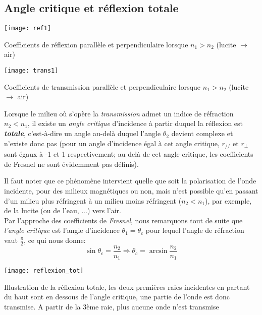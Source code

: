 
\subsection{Angle critique et réflexion totale}
\begin{marginfigure}%
	\texttt{[image: ref1]}
	\caption{Coefficients de réflexion parallèle et perpendiculaire lorsque $n_1>n_2$ (lucite $\rightarrow$ air)}
	\label{fig_ref3}
\end{marginfigure} 
\begin{marginfigure}%
	\texttt{[image: trans1]}
	\caption{Coefficients de transmission parallèle et perpendiculaire lorsque $n_1>n_2$ (lucite $\rightarrow$ air)}
\end{marginfigure} 
Lorsque le milieu où s'opère la \textit{transmission} admet un indice de réfraction $n_{2}<n_{1}$, il existe un \textit{angle critique} d'incidence à partir duquel la réflexion est \textit{\textbf{totale}}, c'est-à-dire un angle au-delà duquel l'angle $\theta_2$ devient complexe et n'existe donc pas (pour un angle d'incidence égal à cet angle critique, $r_{//}$ et $r_{\perp}$ sont égaux à  -1 et 1 respectivement; au delà de cet angle critique, les coefficients de Fresnel ne sont évidemment pas définis). 

Il faut noter que ce phénomène intervient quelle que soit la polarisation de l'onde incidente, pour des milieux magnétiques ou non, mais n'est possible qu'en passant d'un milieu plus réfringent à un milieu moins réfringent ($n_{2} < n_1$), par exemple, de la lucite (ou de l'eau, ...) vers l'air.\\ 

Par l'approche des coefficients de \textit{Fresnel}, nous remarquons tout de suite que \textit{l'angle critique} est l'angle d'incidence $\theta_{1} = \theta_{c}$ pour lequel l'angle de réfraction vaut $\frac{\pi}{2}$, ce qui nous donne: 
\[\sin \theta_{c} = \frac{n_{2}}{n_{1}} \Rightarrow \theta_{c} = \arcsin \frac{n_{2}}{n_{1}}\]
\begin{marginfigure}%
	\texttt{[image: reflexion\_tot]}
	\caption{Illustration de la réflexion totale, les deux premières raies incidentes en partant du haut sont en dessous de l'angle critique, une partie de l'onde est donc transmise. A partir de la 3ème raie, plus aucune onde n'est transmise}
\end{marginfigure}

